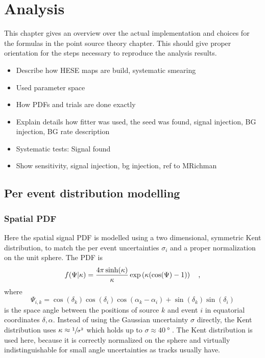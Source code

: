 \chapter{Analysis}

This chapter gives an overview over the actual implementation and choices for the formulas in the point source theory chapter.
This should give proper orientation for the steps necessary to reproduce the analysis results.

\begin{itemize}
  \item Describe how HESE maps are build, systematic smearing
  \item Used parameter space
  \item How PDFs and trials are done exactly
  \item Explain details how fitter was used, the seed was found, signal injection, BG injection, BG rate description
  \item Systematic tests: Signal found
  \item Show sensitivity, signal injection, bg injection, ref to MRichman
\end{itemize}


\section{Per event distribution modelling}
\subsection*{Spatial PDF}
Here the spatial signal PDF is modelled using a two dimensional, symmetric Kent distribution, to match the per event uncertainties $\sigma_i$ and a proper normalization on the unit sphere.
The PDF is
\begin{equation}
  f(\Psi|\kappa)
  = \frac{4\pi \sinh(\kappa)}{\kappa}\exp\left(\kappa(\cos(\Psi)-1)\right)
  \quad\text{,}
\end{equation}
where
\begin{equation}
  \Psi_{i,k}
  = \cos(\delta_k)\cos(\delta_i)\cos(\alpha_k - \alpha_i) +
    \sin(\delta_k)\sin(\delta_i)
\end{equation}
is the space angle between the positions of source $k$ and event $i$ in equatorial coordinates $\delta, \alpha$.
Instead of using the Gaussian uncertainty $\sigma$ directly, the Kent distribution uses $\kappa \approx \sfrac{1}{\sigma^2}$ which holds up to $\sigma \approx \SI{40}{\degree}$ .
The Kent distribution is used here, because it is correctly normalized on the sphere and virtually indistinguishable for small angle uncertainties as tracks usually have.

